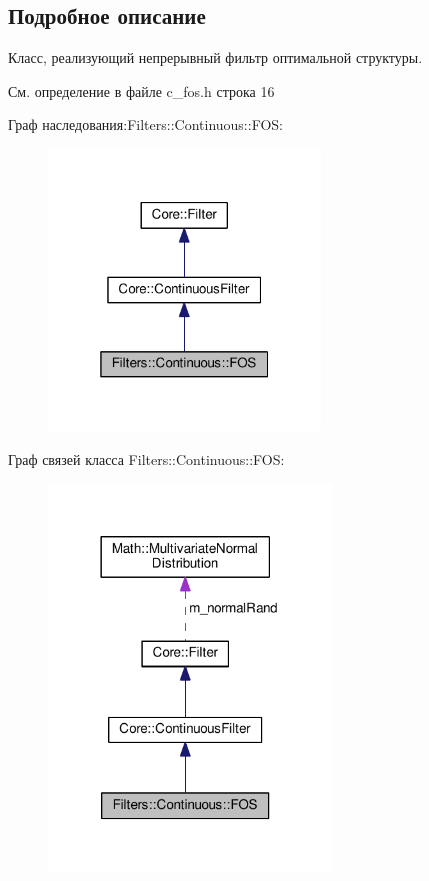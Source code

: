 \subsection{Подробное описание}
Класс, реализующий непрерывный фильтр оптимальной структуры. 

См. определение в файле c\+\_\+fos.\+h строка 16



Граф наследования\+:Filters\+:\+:Continuous\+:\+:F\+OS\+:
\nopagebreak
\begin{figure}[H]
\begin{center}
\leavevmode
\includegraphics[width=205pt]{class_filters_1_1_continuous_1_1_f_o_s__inherit__graph}
\end{center}
\end{figure}


Граф связей класса Filters\+:\+:Continuous\+:\+:F\+OS\+:
\nopagebreak
\begin{figure}[H]
\begin{center}
\leavevmode
\includegraphics[width=213pt]{class_filters_1_1_continuous_1_1_f_o_s__coll__graph}
\end{center}
\end{figure}


